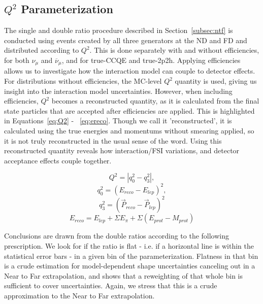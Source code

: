 \documentclass[12pt]{article}
\begin{document}
\subsection{$Q^2$ Parameterization}
\label{subsec:q2}
The single and double ratio procedure described in Section~\ref{subsec:ntf} is conducted using events created by all three generators at the ND and FD and distributed according to $Q^2$. This is done separately with and without efficiencies, for both $\nu_{\mu}$ and $\overline{\nu}_{\mu}$, and for true-CCQE and true-2p2h. Applying efficiencies allows us to investigate how the interaction model can couple to detector effects. For distributions without efficiencies, the MC-level $Q^2$ quantity is used, giving us insight into the interaction model uncertainties. However, when including efficiencies, $Q^2$ becomes a reconstructed quantity, as it is calculated from the final state particles that are accepted after efficiencies are applied. This is highlighted in Equations~\ref{eq:Q2} - ~\ref{eq:ereco}. Though we call it 'reconstructed', it is calculated using the true energies and momentums without smearing applied, so it is not truly reconstructed in the usual sense of the word. Using this reconstructed quantity reveals how interaction/FSI variations, and detector acceptance effects couple together.

\begin{equation}
\label{eq:Q2}
Q^2 = |q_0^2 - q_3^2|,
\end{equation}
\begin{equation}
\label{eq:q0}
q_0^2 = (E_{reco} - E_{lep})^2,
\end{equation}
\begin{equation}
\label{eq:q3}
q_3^2 = (\vec{P}_{reco} - \vec{P}_{lep})^2
\end{equation}
\begin{equation}
E_{reco} =E_{lep} + \Sigma E_{\pi} + \Sigma (E_{prot} - M_{prot})
\label{eq:ereco}
\end{equation}

Conclusions are drawn from the double ratios according to the following prescription. We look for if the ratio is flat - i.e. if a horizontal line is within the statistical error bars - in a given bin of the parameterization. Flatness in that bin is a crude estimation for model-dependent shape uncertainties canceling out in a Near to Far extrapolation, and shows that a reweighting of that whole bin is sufficient to cover uncertainties. Again, we stress that this is a crude approximation to the Near to Far extrapolation.
 
\end{document}
